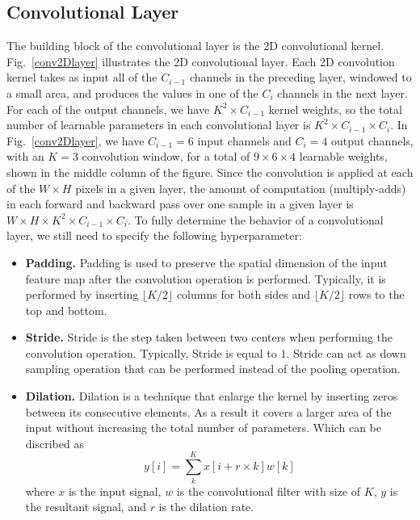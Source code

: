 \subsection{Convolutional Layer}
The building block of the convolutional layer is the 2D convolutional kernel. Fig.~\ref{conv2Dlayer} illustrates the 2D convolutional layer. Each 2D convolution kernel takes as input all of the $C_{i-1}$ channels in the preceding layer, windowed to a small area, and produces the values in one of the $C_{i}$ channels in the next layer. For each of the output channels, we have $K^2\times C_{i-1}$ kernel weights, so the total number of learnable parameters in each convolutional layer is $K^2\times C_{i-1} \times C_{i}$. In Fig.~\ref{conv2Dlayer}, we have $C_{i-1} = 6$ input channels and $C_{i} = 4$ output channels, with an $K = 3$ convolution window, for a total of $9 \times 6 \times 4$ learnable weights, shown in the middle column of the figure. Since the convolution is applied at each of the $W \times H$ pixels in a given layer, the amount of computation (multiply-adds) in each forward and backward pass
over one sample in a given layer is $W\times H \times K^{2} \times C_{i-1} \times C_{i}$.
To fully determine the behavior of a convolutional layer, we still need to specify the following hyperparameter:
\begin{itemize}
    \item \textbf{Padding.} Padding is used to preserve the spatial dimension of the input feature map after the convolution operation is performed. Typically, it is performed by inserting $\lfloor K/2 \rfloor$ columns for both sides and $\lfloor K/2 \rfloor$ rows to the top and bottom.
    \item \textbf{Stride.} Stride is the step taken between two centers when performing the convolution operation. Typically, Stride is equal to $1$. Stride can act as down sampling operation that can be performed instead of the pooling operation.
    \item \textbf{Dilation.} Dilation is a technique that enlarge the kernel by inserting zeros between its consecutive elements. As a result it covers a larger area of the input without increasing the total number of parameters. Which can be discribed as \[y[i]=\sum_{k}^{K} x[i+r\times k] w[k]\] where $x$ is the input signal, $w$ is the convolutional filter with size of $K$, $y$ is the resultant signal, and $r$ is the dilation rate.
\end{itemize}

